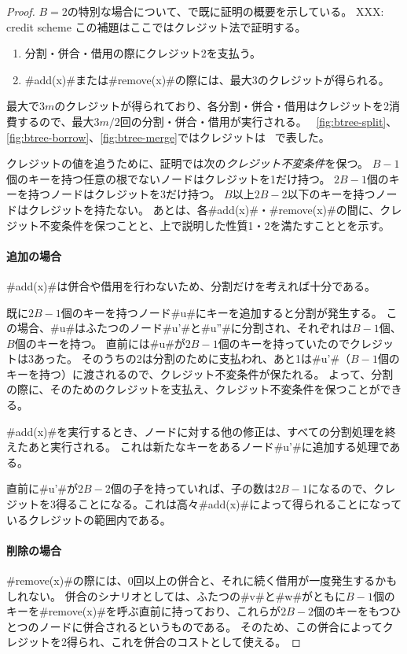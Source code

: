 \begin{proof}
   $B=2$の特別な場合について、で既に証明の概要を示している。
   XXX: credit scheme
   この補題はここではクレジット法で証明する。
  \begin{enumerate}
    \item 分割・併合・借用の際にクレジット2を支払う。
    \item #add(x)#または#remove(x)#の際には、最大3のクレジットが得られる。
  \end{enumerate}
  最大で$3m$のクレジットが得られており、各分割・併合・借用はクレジットを2消費するので、最大$3m/2$回の分割・併合・借用が実行される。
  ~\ref{fig:btree-split}、\ref{fig:btree-borrow}、\ref{fig:btree-merge}ではクレジットは \cent\ で表した。

  クレジットの値を追うために、証明では次の\emph{クレジット不変条件}を保つ。
  $B-1$個のキーを持つ任意の根でないノードはクレジットを1だけ持つ。
  $2B-1$個のキーを持つノードはクレジットを3だけ持つ。
  $B$以上$2B-2$以下のキーを持つノードはクレジットを持たない。
  あとは、各#add(x)#・#remove(x)#の間に、クレジット不変条件を保つことと、上で説明した性質1・2を満たすこととを示す。

  \paragraph{追加の場合}
  #add(x)#は併合や借用を行わないため、分割だけを考えれば十分である。

  既に$2B-1$個のキーを持つノード#u#にキーを追加すると分割が発生する。
  この場合、#u#はふたつのノード#u'#と#u''#に分割され、それぞれは$B-1$個、$B$個のキーを持つ。
  直前には#u#が$2B-1$個のキーを持っていたのでクレジットは3あった。
  そのうちの2は分割のために支払われ、あと1は#u'#（$B-1$個のキーを持つ）に渡されるので、クレジット不変条件が保たれる。
  よって、分割の際に、そのためのクレジットを支払え、クレジット不変条件を保つことができる。

  #add(x)#を実行するとき、ノードに対する他の修正は、すべての分割処理を終えたあと実行される。
  これは新たなキーをあるノード#u'#に追加する処理である。

  直前に#u'#が$2B-2$個の子を持っていれば、子の数は$2B-1$になるので、クレジットを3得ることになる。これは高々#add(x)#によって得られることになっているクレジットの範囲内である。

  \paragraph{削除の場合}
  #remove(x)#の際には、0回以上の併合と、それに続く借用が一度発生するかもしれない。
  併合のシナリオとしては、ふたつの#v#と#w#がともに$B-1$個のキーを#remove(x)#を呼ぶ直前に持っており、これらが$2B-2$個のキーをもつひとつのノードに併合されるというものである。
  そのため、この併合によってクレジットを2得られ、これを併合のコストとして使える。


\end{proof}
